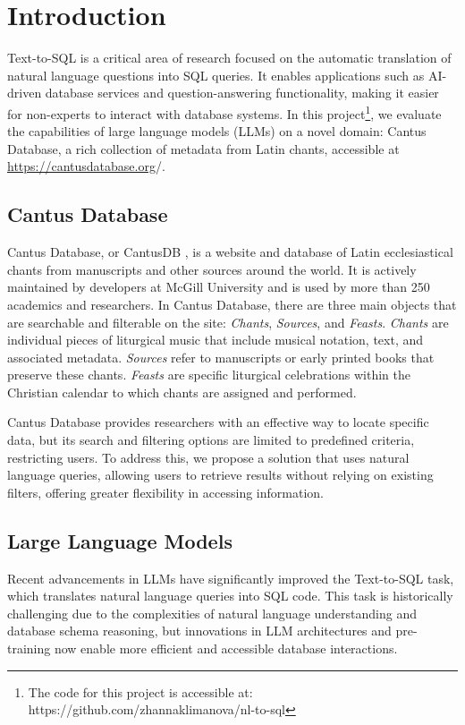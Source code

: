 \section{Introduction}

Text-to-SQL is a critical area of research focused on the automatic translation of natural language questions into SQL queries. It enables applications such as AI-driven database services and question-answering functionality, making it easier for non-experts to interact with database systems. In this project\footnote{The code for this project is accessible at: https://github.com/zhannaklimanova/nl-to-sql}, we evaluate the capabilities of large language models (LLMs) on a novel domain: Cantus Database, a rich collection of metadata from Latin chants, accessible at \url{https://cantusdatabase.org}/.

\subsection{Cantus Database}
Cantus Database, or CantusDB \cite{cantusdatabase}, is a website and database of Latin ecclesiastical chants from manuscripts and other sources around the world. It is actively maintained by developers at McGill University and is used by more than 250 academics and researchers. In Cantus Database, there are three main objects that are searchable and filterable on the site: \textit{Chants}, \textit{Sources}, and \textit{Feasts}. \textit{Chants} are individual pieces of liturgical music that include musical notation, text, and associated metadata. \textit{Sources} refer to manuscripts or early printed books that preserve these chants. \textit{Feasts} are specific liturgical celebrations within the Christian calendar to which chants are assigned and performed.

Cantus Database provides researchers with an effective way to locate specific data, but its search and filtering options are limited to predefined criteria, restricting users. To address this, we propose a solution that uses natural language queries, allowing users to retrieve results without relying on existing filters, offering greater flexibility in accessing information.

\subsection{Large Language Models}
Recent advancements in LLMs have significantly improved the Text-to-SQL task, which translates natural language queries into SQL code. This task is historically challenging due to the complexities of natural language understanding and database schema reasoning, but innovations in LLM architectures and pre-training now enable more efficient and accessible database interactions.

